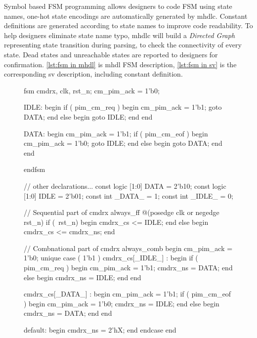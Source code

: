 Symbol based FSM programming allows designers to code FSM using
state names, one-hot state encodings are automatically generated
by \gls{mhdlc}. Constant definitions are generated according to state
names to improve code readability. To help designers eliminate state
name typo, \gls{mhdlc} will build a \emph{Directed Graph} representing state
transition during parsing, to check the connectivity of every state. Dead
states and unreachable states are reported to designers for
confirmation. \autoref{lst:fsm in mhdl} is \gls{mhdl} FSM description,
\autoref{lst:fsm in sv} is the corresponding \gls{sv} description, including
constant definition. 

\begin{figure}[pbt]
\begin{minipage}[t]{.48\textwidth}
\begin{mhdle}[caption={FSM in MetaHDL}, label={lst:fsm in mhdl}]
fsm cmdrx, clk, rst_n;
  cm_pim_ack = 1'b0;
  
  IDLE: begin
    if ( pim_cm_req ) begin
      cm_pim_ack = 1'b1;
      goto DATA;
    end
    else begin
      goto IDLE;
    end
  end

  DATA: begin
    cm_pim_ack = 1'b1;
    if ( pim_cm_eof ) begin
      cm_pim_ack = 1'b0;
      goto IDLE;
    end
    else begin
      goto DATA;
    end
  end

endfsm
\end{mhdle}
\end{minipage}
\hfill
\begin{minipage}[t]{.48\textwidth}
\begin{mhdle}[caption={Generated FSM in SystemVerilog}, label={lst:fsm in sv}]
// other declarations...
const logic [1:0] DATA = 2'b10;
const logic [1:0] IDLE = 2'b01;
const int _DATA_ = 1;
const int _IDLE_ = 0;

// Sequential part of  cmdrx
always_ff @(posedge clk or negedge rst_n)
  if (~rst_n) begin
    cmdrx_cs <= IDLE;
  end
  else begin
    cmdrx_cs <= cmdrx_ns;
  end

// Combnational part of cmdrx
always_comb begin
  cm_pim_ack = 1'b0;
  unique case ( 1'b1 )
    cmdrx_cs[_IDLE_] : begin
      if ( pim_cm_req ) begin
        cm_pim_ack = 1'b1;
        cmdrx_ns = DATA;
      end
      else begin
        cmdrx_ns = IDLE;
      end
    end

    cmdrx_cs[_DATA_] : begin
      cm_pim_ack = 1'b1;
      if ( pim_cm_eof ) begin
        cm_pim_ack = 1'b0;
        cmdrx_ns = IDLE;
      end
      else begin
        cmdrx_ns = DATA;
      end
    end

    default: begin
      cmdrx_ns = 2'hX;
    end
  endcase
end
\end{mhdle}
\end{minipage}
\end{figure}

